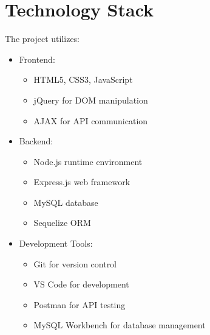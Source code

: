 \section{Technology Stack}
The project utilizes:
\begin{itemize}
    \item Frontend:
    \begin{itemize}
        \item HTML5, CSS3, JavaScript \cite{webdev2023}
        \item jQuery for DOM manipulation
        \item AJAX for API communication
    \end{itemize}
    \item Backend:
    \begin{itemize}
        \item Node.js runtime environment \cite{nodejs}
        \item Express.js web framework \cite{expressjs}
        \item MySQL database \cite{mysql}
        \item Sequelize ORM
    \end{itemize}
    \item Development Tools:
    \begin{itemize}
        \item Git for version control
        \item VS Code for development
        \item Postman for API testing
        \item MySQL Workbench for database management
    \end{itemize}
\end{itemize}

